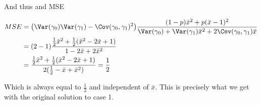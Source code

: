 And thus and MSE

\begin{align*}
	MSE &= \big(\Var(\gamma_0) \Var(\gamma_1) - \Cov(\gamma_0, \gamma_1)^2 \big)\frac{(1 - p) \bar{x}^2  + p(\bar{x} - 1)^2 }{\Var(\gamma_0) + \Var(\gamma_1) \bar{x}^2 + 2 \Cov(\gamma_0, \gamma_1) \bar{x}} \\
		&= (2 - 1)\frac{\frac{1}{2} \bar{x}^2 + \frac{1}{2}(\bar{x}^2 - 2 \bar{x} + 1)}{1 - 2 \bar{x} + 2 \bar{x}^2} \\
		&= \frac{\frac{1}{2} \bar{x}^2 + \frac{1}{2}(\bar{x}^2 - 2\bar{x} + 1)}{2(\frac{1}{2} -  \bar{x} + \bar{x}^2)} = \frac{1}{2}
\end{align*} 

Which is always equal to $\frac{1}{2}$ and independent of $\bar{x}$. This is precisely what we get with the original solution to case 1.












